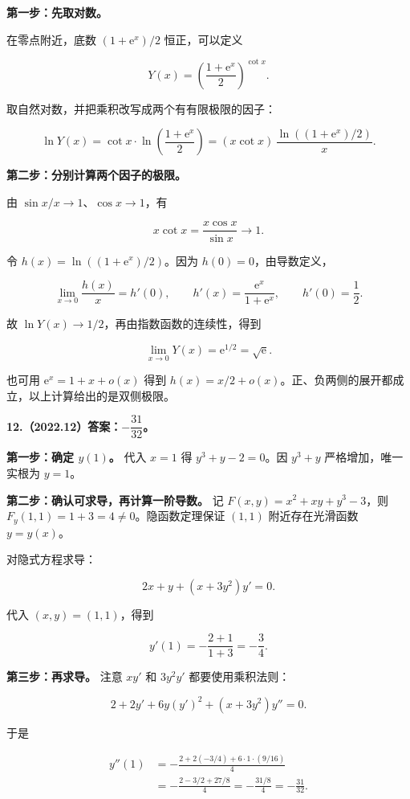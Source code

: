 \documentclass[UTF8,11pt,fontset=windows]{ctexart}
\begin{document}
\textbf{第一步：先取对数。}

在零点附近，底数 $(1+\mathrm e^x)/2$ 恒正，可以定义

$$
Y(x)=\left(\frac{1+\mathrm e^x}{2}\right)^{\cot x}.
$$

取自然对数，并把乘积改写成两个有有限极限的因子：

$$
\ln Y(x)
=\cot x\cdot\ln\left(\frac{1+\mathrm e^x}{2}\right)
=(x\cot x)\,\frac{\ln((1+\mathrm e^x)/2)}x.
$$

\textbf{第二步：分别计算两个因子的极限。}

由 $\sin x/x\to1$、$\cos x\to1$，有

$$
x\cot x=\frac{x\cos x}{\sin x}\longrightarrow1.
$$

令 $h(x)=\ln((1+\mathrm e^x)/2)$。因为 $h(0)=0$，由导数定义，

$$
\lim_{x\to0}\frac{h(x)}x=h'(0),
\qquad h'(x)=\frac{\mathrm e^x}{1+\mathrm e^x},
\qquad h'(0)=\frac12.
$$

故 $\ln Y(x)\to1/2$，再由指数函数的连续性，得到

$$
\boxed{\lim_{x\to0}Y(x)=\mathrm e^{1/2}=\sqrt{\mathrm e}}.
$$

也可用 $\mathrm e^x=1+x+o(x)$ 得到 $h(x)=x/2+o(x)$。正、负两侧的展开都成立，以上计算给出的是双侧极限。

\clearpage

\textbf{12.（2022.12）答案：$-\dfrac{31}{32}$。}

\textbf{第一步：确定 $y(1)$。} 代入 $x=1$ 得 $y^3+y-2=0$。因 $y^3+y$ 严格增加，唯一实根为 $y=1$。

\textbf{第二步：确认可求导，再计算一阶导数。} 记 $F(x,y)=x^2+xy+y^3-3$，则 $F_y(1,1)=1+3=4\ne0$。隐函数定理保证 $(1,1)$ 附近存在光滑函数 $y=y(x)$。

对隐式方程求导：

$$
2x+y+(x+3y^2)y'=0.
$$

代入 $(x,y)=(1,1)$，得到

$$
y'(1)=-\frac{2+1}{1+3}=-\frac34.
$$

\textbf{第三步：再求导。} 注意 $xy'$ 和 $3y^2y'$ 都要使用乘积法则：

$$
2+2y'+6y(y')^2+(x+3y^2)y''=0.
$$

于是

$$
\begin{aligned}
y''(1)
&=-\frac{2+2(-3/4)+6\cdot1\cdot(9/16)}{4}\\
&=-\frac{2-3/2+27/8}{4}
=-\frac{31/8}{4}=-\frac{31}{32}.
\end{aligned}
$$
\end{document}
